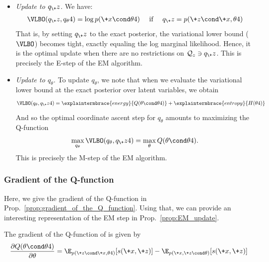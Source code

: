 \documentclass{article} %
\newcommand{\sufficientStatsFunction}{s}
\newcommand{\param}{\theta}
\begin{document}
\begin{itemize}
\item \textit{Update to $q_\+z$.} We have:
%
\begin{align}
\VLBO(q_\+z, q_\param^^t) = \log p(\+x \cond \param^^t) \quad \text{ if } \quad 	q_\+z=p(\+z \cond \+x, \param^^t)
\end{align}
%
That is, by setting $q_\+z$ to the exact posterior, the variational lower bound ($\VLBO$) becomes tight, exactly equaling the log marginal likelihood. Hence, it is the optimal update when there are no restrictions on $\mathcal{Q}_z \ni q_\+z$.  This is precisely the E-step of the EM algorithm.

\item \textit{Update to $q_\param$.}	 To update $q_\param$, we note that when we evaluate the variational lower bound at the exact posterior over latent variables, we obtain
%
\begin{align}
\VLBO(q_\param, q_\+z^^t) = \explaintermbrace{energy}{Q(\param \cond \param^^t)} + \explaintermbrace{entropy}{H(\param^^t)}
\end{align}
%
And so the optimal coordinate ascent step for $q_\param$ amounts to maximizing the Q-function
%
\begin{align}
\max_{q_\param} \VLBO(q_\param, q_\+z^^t) = \max_{\param}  Q(\param \cond \param^^t). 
\end{align}
%
This is precisely the M-step of the EM algorithm.
\end{itemize}
%

    



\subsubsection{Gradient of the Q-function}

 Here, we give the gradient of the Q-function in Prop.~\ref{prop:gradient_of_the_Q_function}. Using that, we can provide an interesting representation of the EM step  in Prop.~\ref{prop:EM_update}. 


\begin{proposition}
 The gradient of the Q-function of 
is given by 
 \begin{align}
 \frac{\partial Q(\param \cond \param^^t)}{\partial \param} =  \E_{p(\+z \cond \+x, \param^^t)}[\sufficientStatsFunction(\+x,\+z)] - 	\E_{p(\+x, \+z \cond \param)}[\sufficientStatsFunction(\+x,\+z)]
 \label{eqn:gradient_of_Q_function_for_EM}
 \end{align}
%
\label{prop:gradient_of_the_Q_function}
 \end{proposition}
\end{document}
